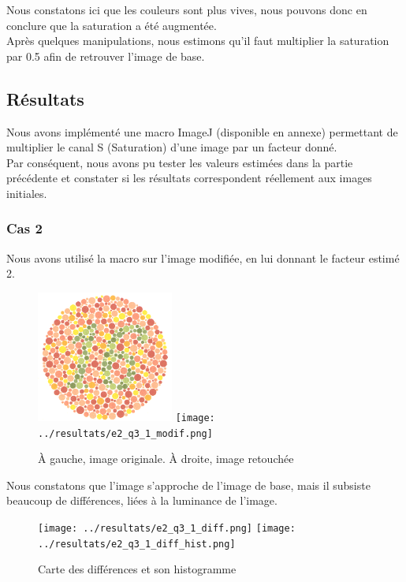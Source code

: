 \documentclass[a4paper]{article}
\begin{document}
Nous constatons ici que les couleurs sont plus vives, nous pouvons donc en conclure que la saturation a été augmentée.\\
Après quelques manipulations, nous estimons qu'il faut multiplier la saturation par 0.5 afin de retrouver l'image de base.

\clearpage
\subsection{Résultats}
Nous avons implémenté une macro ImageJ (disponible en annexe) permettant de multiplier le canal S (Saturation) d'une image par un facteur donné.\\

Par conséquent, nous avons pu tester les valeurs estimées dans la partie précédente et constater si les résultats correspondent réellement aux images initiales.

\subsubsection{Cas 2}
Nous avons utilisé la macro sur l'image modifiée, en lui donnant le facteur estimé 2.

\begin{figure}[H]
\begin{center}
\includegraphics[width=170px]{../base/cas_2_dalton16.png}
\texttt{[image: ../resultats/e2\_q3\_1\_modif.png]}
\end{center}
\caption{À gauche, image originale. À droite, image retouchée}
\end{figure}

Nous constatons que l'image s'approche de l'image de base, mais il subsiste beaucoup de différences, liées à la luminance de l'image.

\begin{figure}[H]
\begin{center}
\texttt{[image: ../resultats/e2\_q3\_1\_diff.png]}
\texttt{[image: ../resultats/e2\_q3\_1\_diff\_hist.png]}
\end{center}
\caption{Carte des différences et son histogramme}
\end{figure}
\end{document}
